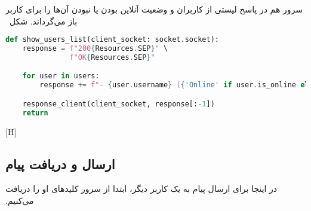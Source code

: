 ‫سرور هم در پاسخ لیستی از کاربران و وضعیت آنلاین بودن یا نبودن آن‌ها را برای کاربر باز می‌گرداند. شکل~
\begin{latin}
\begin{lstlisting}[firstnumber=154, language=Python]
def show_users_list(client_socket: socket.socket):
    response = f"200{Resources.SEP}" \
               f"OK{Resources.SEP}"

    for user in users:
        response += f"- {user.username} ({'Online' if user.is_online else 'Offline'})\n"

    response_client(client_socket, response[:-1])
    return
\end{lstlisting}
\end{latin}
‫
‫[H]
‫
‫
‫
‫
‫
‫\subsection{ارسال و دریافت پیام}
‫در اینجا برای ارسال پیام به یک کاربر دیگر، ابتدا از سرور کلید‌های او را دریافت می‌کنیم.
‫

